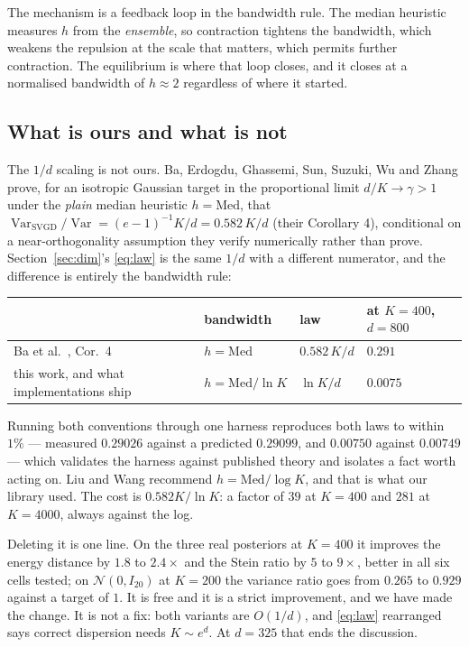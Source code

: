 \documentclass[11pt]{article}
\newcommand{\Var}{\operatorname{Var}}
\theoremstyle{remark}
\begin{document}
The mechanism is a feedback loop in the bandwidth rule. The median heuristic measures $h$ from the
\emph{ensemble}, so contraction tightens the bandwidth, which weakens the repulsion at the scale
that matters, which permits further contraction. The equilibrium is where that loop closes, and it
closes at a normalised bandwidth of $h \approx 2$ regardless of where it started.

\subsection{What is ours and what is not}

The $1/d$ scaling is not ours. Ba, Erdogdu, Ghassemi, Sun, Suzuki, Wu and Zhang \cite{ba2022}
prove, for an isotropic Gaussian target in the proportional limit $d/K \to \gamma > 1$ under the
\emph{plain} median heuristic $h = \mathrm{Med}$, that
$\Var_{\mathrm{SVGD}}/\Var = (e-1)^{-1}K/d = 0.582\,K/d$ (their Corollary 4), conditional on a
near-orthogonality assumption they verify numerically rather than prove. Section~\ref{sec:dim}'s
\eqref{eq:law} is the same $1/d$ with a different numerator, and the difference is entirely the
bandwidth rule:

\begin{table}[t]
\centering\small
\begin{tabular}{llll}
\toprule
& bandwidth & law & at $K = 400$, $d = 800$\\
\midrule
Ba et al.\ \cite{ba2022}, Cor.~4 & $h = \mathrm{Med}$ & $0.582\,K/d$ & $0.291$\\
this work, and what implementations ship & $h = \mathrm{Med}/\ln K$ & $\ln K/d$ & $0.0075$\\
\bottomrule
\end{tabular}
\end{table}

Running both conventions through one harness reproduces both laws to within $1\%$ --- measured
$0.29026$ against a predicted $0.29099$, and $0.00750$ against $0.00749$ --- which validates the
harness against published theory and isolates a fact worth acting on. Liu and Wang \cite{liu2016}
recommend $h = \mathrm{Med}/\log K$, and that is what our library used. The cost is
$0.582K/\ln K$: a factor of $39$ at $K = 400$ and $281$ at $K = 4000$, always against the log.

Deleting it is one line. On the three real posteriors at $K = 400$ it improves the energy distance
by $1.8$ to $2.4\times$ and the Stein ratio by $5$ to $9\times$, better in all six cells tested; on
$\mathcal N(0, I_{20})$ at $K = 200$ the variance ratio goes from $0.265$ to $0.929$ against a
target of $1$. It is free and it is a strict improvement, and we have made the change. It is not a
fix: both variants are $O(1/d)$, and \eqref{eq:law} rearranged says correct dispersion needs
$K \sim e^{d}$. At $d = 325$ that ends the discussion.
\end{document}
